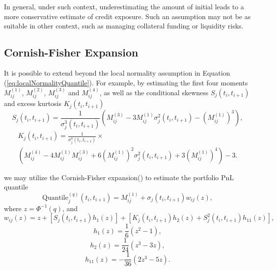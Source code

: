 \documentclass[preprint,12pt]{elsarticle}
\begin{document}
In general, under such context, underestimating the amount of initial leads to a more conservative estimate of credit exposure. Such an assumption may not be as suitable in other context, such as managing collateral funding or liquidity risks.
 
\subsection{Cornish-Fisher Expansion}\label{s:CornishFisherExpansion}
It is possible to extend beyond the local normality assumption in Equation (\ref{eq:localNormalityQuantile}). For example, by estimating the first four moments $M_{ij}^{(1)}$, $M_{ij}^{(2)}$, $M_{ij}^{(3)}$ and $M_{ij}^{(4)}$, as well as the conditional skewness $S_{j}(t_{i},t_{i+1})$ and excess kurtosis $K_{j}(t_{i},t_{i+1})$
\begin{equation}
S_{j}(t_{i},t_{i+1})=\frac{1}{\sigma_{j}^{3}(t_{i},t_{i+1})}\left(M_{ij}^{(3)}-3M_{ij}^{(1)}\sigma_{j}^{2}(t_{i},t_{i+1})-\left(M_{ij}^{(1)}\right)^{3}\right),
\end{equation}  
\begin{multline}
K_{j}(t_{i},t_{i+1})=\frac{1}{\sigma_{j}^{4} (t_{i},t_{i+1})}\times \\
\left(M_{ij}^{(4)}-4M_{ij}^{(1)}M_{ij}^{(3)}+6\left(M_{ij}^{(1)}\right)^{2}\sigma_{j}^{2}(t_{i},t_{i+1})+3\left(M_{ij}^{(1)}\right)^{4}\right) -3.
\end{multline}  

we may utilize the Cornish-Fisher expansion(\citep{cornishFisher1960}) to estimate the portfolio PnL quantile
\begin{equation}
\textrm{Quantile}_{j}^{(q)}(t_{i},t_{i+1})=M_{ij}^{(1)}+\sigma_{j}(t_{i},t_{i+1})w_{ij}(z),
\end{equation}
where $z=\Phi^{-1}\left(q\right)$, and 
\begin{equation}
w_{ij}(z)=z+\left[S_{j}(t_{i},t_{i+1})h_{1}(z)\right]+\left[K_{j}(t_{i},t_{i+1})h_{2}(z)+S_{j}^{2}(t_{i},t_{i+1})h_{11}(z)\right],
\end{equation}
\begin{equation}
h_{1}(z)=\frac{1}{6}\left(z^{2}-1\right),
\end{equation}
\begin{equation}
h_{2}(z)=\frac{1}{24}\left(z^{3}-3z\right),
\end{equation}
\begin{equation}
h_{11}(z)=-\frac{1}{36}\left(2z^{3}-5z\right).
\end{equation}
\end{document}
